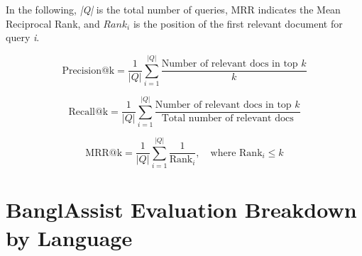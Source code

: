 \documentclass[sigconf]{acmart}
\begin{document}
In the following, \textit{|Q|} is the total number of queries, MRR indicates the Mean Reciprocal Rank, and $Rank_{i}$ is the position of the first relevant document for query \textit{i}.

\begin{equation} \label{eq1}
    \text{Precision@k} = \frac{1}{|Q|} \sum_{i=1}^{|Q|} \frac{\text{Number of relevant docs in top } k}{k}
\end{equation}

\begin{equation} \label{eq2}
    \text{Recall@k} = \frac{1}{|Q|} \sum_{i=1}^{|Q|} \frac{\text{Number of relevant docs in top } k}{\text{Total number of relevant docs}}
\end{equation}

\begin{equation} \label{eq3}
    \text{MRR@k} = \frac{1}{|Q|} \sum_{i=1}^{|Q|} \frac{1}{\text{Rank}_i}, \quad \text{where } \text{Rank}_i \leq k 
\end{equation}

\section{BanglAssist Evaluation Breakdown by Language}
\label{appendix:g}
\end{document}
